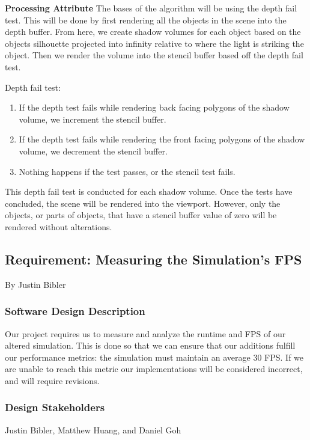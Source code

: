 \begin{flushleft}
\textbf{Processing Attribute}
The bases of the algorithm will be using the depth fail test.
This will be done by first rendering all the objects in the scene into the depth buffer.
From here, we create shadow volumes for each object based on the objects silhouette projected into infinity relative to where the light is striking the object.
Then we render the volume into the stencil buffer based off the depth fail test.

Depth fail test:
\begin{enumerate}
\item If the depth test fails while rendering back facing polygons of the shadow volume, we increment the stencil buffer.
\item If the depth test fails while rendering the front facing polygons of the shadow volume, we decrement the stencil buffer.
\item Nothing happens if the test passes, or the stencil test fails.
\end{enumerate}

This depth fail test is conducted for each shadow volume.
Once the tests have concluded, the scene will be rendered into the viewport.
However, only the objects, or parts of objects, that have a stencil buffer value of zero will be rendered without alterations. \cite{shadow}

\newpage

\subsection{Requirement: Measuring the Simulation's FPS}
\large{By Justin Bibler}

\normalsize
\subsubsection{Software Design Description}
Our project requires us to measure and analyze the runtime and FPS of our altered simulation.
This is done so that we can ensure that our additions fulfill our performance metrics: the simulation must maintain an average 30 FPS.
 If we are unable to reach this metric our implementations will be considered incorrect, and will require revisions.

\subsubsection{Design Stakeholders}
Justin Bibler, Matthew Huang, and Daniel Goh


\end{flushleft}
